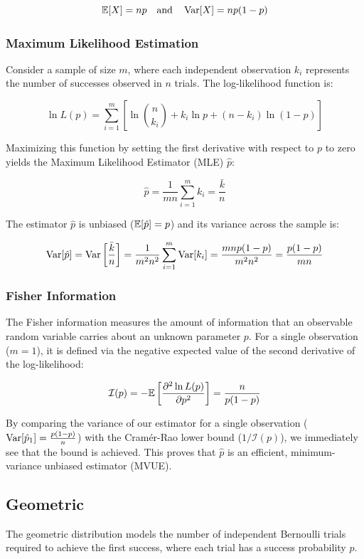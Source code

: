 	\[
	\mathbb{E}[X] = np \quad \text{and} \quad \operatorname{Var}[X] = np(1-p)
	\]

\subsubsection{Maximum Likelihood Estimation}
Consider a sample of size $m$, where each independent observation $k_i$ represents the number of successes observed in $n$ trials. The log-likelihood function is:

	\[
	\ln L(p) = \sum_{i=1}^m \left[ \ln\binom{n}{k_i} + k_i\ln p + (n-k_i)\ln(1-p) \right]
	\]
	
Maximizing this function by setting the first derivative with respect to $p$ to zero yields the Maximum Likelihood Estimator (MLE) $\hat{p}$:

	\[
	\hat{p} = \frac{1}{mn} \sum_{i=1}^m k_i = \frac{\bar{k}}{n}
	\]
	
The estimator $\hat{p}$ is unbiased ($\mathbb{E}[\hat{p}] = p$) and its variance across the sample is:
	
	\[
	\operatorname{Var}[\hat{p}] = \operatorname{Var}\left[\frac{\bar{k}}{n}\right] = \frac{1}{m^2n^2} \sum_{i=1}^m \operatorname{Var}[k_i] = \frac{mnp(1-p)}{m^2n^2} = \frac{p(1-p)}{mn}
	\]

\subsubsection{Fisher Information}
The Fisher information measures the amount of information that an observable random variable carries about an unknown parameter $p$. For a single observation ($m=1$), it is defined via the negative expected value of the second derivative of the log-likelihood:

	\[
	\mathcal{I}(p) = -\mathbb{E}\left[ \frac{\partial^2 \ln L(p)}{\partial p^2} \right] = \frac{n}{p(1-p)}
	\] 
	
By comparing the variance of our estimator for a single observation ($\operatorname{Var}[\hat{p}_1] = \frac{p(1-p)}{n}$) with the Cram\'{e}r-Rao lower bound ($1/\mathcal{I}(p)$), we immediately see that the bound is achieved. This proves that $\hat{p}$ is an efficient, minimum-variance unbiased estimator (MVUE).

\clearpage
\subsection{Geometric}

The geometric distribution models the number of independent Bernoulli trials required to achieve the first success, where each trial has a success probability $p$. 

